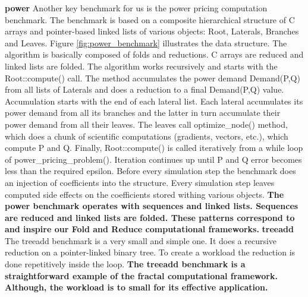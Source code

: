 \quad \textbf{power} \quad Another key benchmark for us is the power pricing computation benchmark. The benchmark is based on a composite hierarchical structure of C arrays and pointer-based linked lists of various objects: Root, Laterals, Branches and Leaves. Figure \ref{fig:power_benchmark} illustrates the data structure. The algorithm is basically composed of folds and reductions. C arrays are reduced and linked lists are folded. The algorithm works recursively and starts with the Root::compute() call. The method accumulates the power demand
Demand(P,Q) from all lists of Laterals and does a reduction to a final Demand(P,Q) value. Accumulation starts with the end of each lateral list. Each lateral accumulates its power demand from all its branches and the latter in turn accumulate their power demand from all their leaves. The leaves call optimize\_node() method, which does a chunk of scientific computations (gradients, vectors, etc.), which compute P and Q. Finally, Root::compute() is called iteratively from a while loop of power\_pricing\_problem(). Iteration continues up until P and Q error becomes less than the required epsilon. Before every simulation step the benchmark does an injection of coefficients into the structure. Every simulation step leaves computed side effects on the coefficients stored withing various objects.\newline\null
\quad \textbf{The power benchmark operates with sequences and linked lists. Sequences are reduced and linked lists are folded. These patterns correspond to and inspire our Fold and Reduce computational frameworks.}\newline\null
\quad \textbf{treeadd} \quad The treeadd benchmark is a very small and simple one. It does a recursive reduction on a pointer-linked binary tree. To create a workload the reduction is done repetitively inside the loop.\newline\null
\quad \textbf{The treeadd benchmark is a straightforward example of the fractal computational framework. Although, the workload is to small for its effective application.}\newline\null
